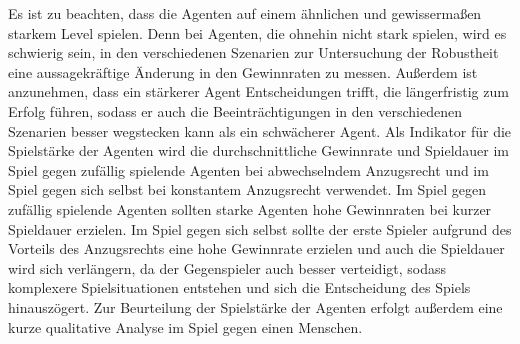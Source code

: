 Es ist zu beachten, dass die Agenten auf einem ähnlichen und gewissermaßen starkem Level spielen. Denn bei Agenten, die ohnehin nicht stark spielen, wird es schwierig sein, in den verschiedenen Szenarien zur Untersuchung der Robustheit eine aussagekräftige Änderung in den Gewinnraten zu messen. Außerdem ist anzunehmen, dass ein stärkerer Agent Entscheidungen trifft, die längerfristig zum Erfolg führen, sodass er auch die Beeinträchtigungen in den verschiedenen Szenarien besser wegstecken kann als ein schwächerer Agent. Als Indikator für die Spielstärke der Agenten wird die durchschnittliche Gewinnrate und Spieldauer im Spiel gegen zufällig spielende Agenten bei abwechselndem Anzugsrecht und im Spiel gegen sich selbst bei konstantem Anzugsrecht verwendet. Im Spiel gegen zufällig spielende Agenten sollten starke Agenten hohe Gewinnraten bei kurzer Spieldauer erzielen. Im Spiel gegen sich selbst sollte der erste Spieler aufgrund des Vorteils des Anzugsrechts eine hohe Gewinnrate erzielen und auch die Spieldauer wird sich verlängern, da der Gegenspieler auch besser verteidigt, sodass komplexere Spielsituationen entstehen und sich die Entscheidung des Spiels hinauszögert. Zur Beurteilung der Spielstärke der Agenten erfolgt außerdem eine kurze qualitative Analyse im Spiel gegen einen Menschen.
